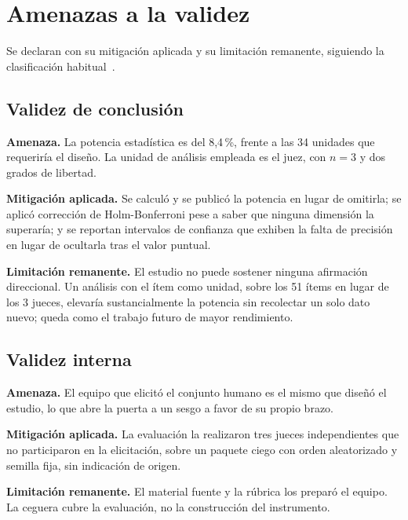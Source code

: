 \documentclass[11pt,a4paper]{article}
\begin{document}
\section{Amenazas a la validez}
\label{sec:amenazas}

Se declaran con su mitigaci\'on aplicada y su limitaci\'on remanente, siguiendo la
clasificaci\'on habitual~\cite{wohlin2012experimentation,runeson2009guidelines}.

\subsection{Validez de conclusi\'on}

\textbf{Amenaza.} La potencia estad\'istica es del 8,4\,\%, frente a las 34 unidades que
requerir\'ia el dise\~no. La unidad de an\'alisis empleada es el juez, con $n = 3$ y dos
grados de libertad.

\textbf{Mitigaci\'on aplicada.} Se calcul\'o y se public\'o la potencia en lugar de
omitirla; se aplic\'o correcci\'on de Holm-Bonferroni pese a saber que ninguna
dimensi\'on la superar\'ia; y se reportan intervalos de confianza que exhiben la falta
de precisi\'on en lugar de ocultarla tras el valor puntual.

\textbf{Limitaci\'on remanente.} El estudio no puede sostener ninguna afirmaci\'on
direccional. Un an\'alisis con el \'item como unidad, sobre los 51 \'items en lugar de
los 3 jueces, elevar\'ia sustancialmente la potencia sin recolectar un solo dato nuevo;
queda como el trabajo futuro de mayor rendimiento.

\subsection{Validez interna}

\textbf{Amenaza.} El equipo que elicit\'o el conjunto humano es el mismo que dise\~n\'o
el estudio, lo que abre la puerta a un sesgo a favor de su propio brazo.

\textbf{Mitigaci\'on aplicada.} La evaluaci\'on la realizaron tres jueces independientes
que no participaron en la elicitaci\'on, sobre un paquete ciego con orden aleatorizado
y semilla fija, sin indicaci\'on de origen.

\textbf{Limitaci\'on remanente.} El material fuente y la r\'ubrica los prepar\'o el
equipo. La ceguera cubre la evaluaci\'on, no la construcci\'on del instrumento.
\end{document}
